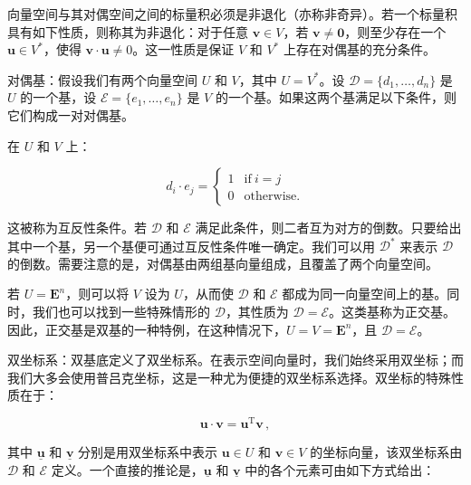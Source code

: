 \documentclass[10pt,a4paper]{book}
\theoremstyle{thmstyle} %
\theoremstyle{defstyle} %
\theoremstyle{prostyle} %
\begin{document}
向量空间与其对偶空间之间的标量积必须是非退化（亦称非奇异）。若一个标量积具有如下性质，则称其为非退化：对于任意 $\boldsymbol{v} \in V$，若 $\boldsymbol{v} \neq \boldsymbol{0}$，则至少存在一个 $\boldsymbol{u} \in V^*$，使得 $\boldsymbol{v} \cdot \boldsymbol{u} \neq 0$。这一性质是保证 $V$ 和 $V^*$ 上存在对偶基的充分条件。



对偶基：假设我们有两个向量空间 $U$ 和 $V$，其中 $U = V^*$。设 $\mathcal{D} = \{d_1, \ldots, d_n\}$ 是 $U$ 的一个基，设 $\mathcal{E} = \{e_1, \ldots, e_n\}$ 是 $V$ 的一个基。如果这两个基满足以下条件，则它们构成一对对偶基。



在 $U$ 和 $V$ 上：



$$
d _ { i } \cdot e _ { j } = \left\{ \begin{array}{ll} { 1 } & { \mathrm { i f ~ } i = j } \\{ 0 } & { \mathrm { o t h e r w i s e } . } \end{array} \right.
$$



这被称为互反性条件。若 $\mathcal{D}$ 和 $\mathcal{E}$ 满足此条件，则二者互为对方的倒数。只要给出其中一个基，另一个基便可通过互反性条件唯一确定。我们可以用 $\mathcal{D}^*$ 来表示 $\mathcal{D}$ 的倒数。需要注意的是，对偶基由两组基向量组成，且覆盖了两个向量空间。



若 $U = \mathbf{E}^{n}$，则可以将 $V$ 设为 $U$，从而使 $\mathcal{D}$ 和 $\mathcal{E}$ 都成为同一向量空间上的基。同时，我们也可以找到一些特殊情形的 $\mathcal{D}$，其性质为 $\mathcal{D} = \mathcal{E}$。这类基称为正交基。因此，正交基是双基的一种特例，在这种情况下，$U = V = \mathbf{E}^{n}$，且 $\mathcal{D} = \mathcal{E}$。



双坐标系：双基底定义了双坐标系。在表示空间向量时，我们始终采用双坐标；而我们大多会使用普吕克坐标，这是一种尤为便捷的双坐标系选择。双坐标的特殊性质在于：



$$
\boldsymbol { u } \cdot \boldsymbol { v } = \boldsymbol { u } ^{\mathrm { T} } \boldsymbol { v } \, ,
$$



其中 $\underline{\boldsymbol{u}}$ 和 $\underline{\boldsymbol{v}}$ 分别是用双坐标系中表示 $\boldsymbol{u} \in U$ 和 $\boldsymbol{v} \in V$ 的坐标向量，该双坐标系由 $\mathcal{D}$ 和 $\mathcal{E}$ 定义。一个直接的推论是，$\underline{\boldsymbol{u}}$ 和 $\underline{\boldsymbol{v}}$ 中的各个元素可由如下方式给出：
\end{document}
